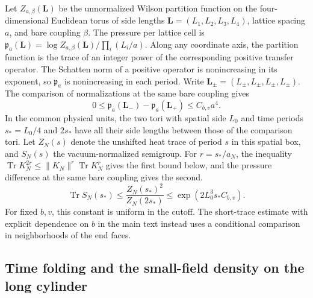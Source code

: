 \documentclass[11pt,a4paper]{article}
\numberwithin{equation}{section}
\newcommand{\Tr}{\operatorname{Tr}}
\begin{document}
Let \(Z_{a,\beta}(\boldsymbol L)\) be the unnormalized Wilson partition function on the four-dimensional Euclidean torus of side lengths \(\boldsymbol L=(L_1,L_2,L_3,L_4)\), lattice spacing \(a\), and bare coupling \(\beta\). The pressure per lattice cell is \(\mathfrak p_a(\boldsymbol L)=\log Z_{a,\beta}(\boldsymbol L)/\prod_i(L_i/a)\). Along any coordinate axis, the partition function is the trace of an integer power of the corresponding positive transfer operator. The Schatten norm of a positive operator is nonincreasing in its exponent, so \(\mathfrak p_a\) is nonincreasing in each period. Write \(\boldsymbol L_\pm=(L_\pm,L_\pm,L_\pm,L_\pm)\). The comparison of normalizations at the same bare coupling gives
\begin{equation}
 0\le\mathfrak p_a(\boldsymbol L_-)-\mathfrak p_a(\boldsymbol L_+)\le C_{b,v}a^4 .
 \label{eq:geom-pressure}
\end{equation}
In the common physical units, the two tori with spatial side \(L_0\) and time periods \(s_*=L_0/4\) and \(2s_*\) have all their side lengths between those of the comparison tori. Let \(Z_N(s)\) denote the unshifted heat trace of period \(s\) in this spatial box, and \(S_N(s)\) the vacuum-normalized semigroup. For \(r=s_*/a_N\), the inequality \(\Tr K_N^{2r}\le\|K_N\|^r\Tr K_N^r\) gives the first bound below, and the pressure difference at the same bare coupling gives the second.
\[
 \Tr S_N(s_*)\le
    \frac{Z_N(s_*)^2}{Z_N(2s_*)}
 \le \exp(2L_0^3s_* C_{b,v}) .
\]
For fixed \(b,v\), this constant is uniform in the cutoff. The short-trace estimate with explicit dependence on \(b\) in the main text instead uses a conditional comparison in neighborhoods of the end faces.

\subsection{Time folding and the small-field density on the long cylinder}
\label{lem:geometry-fold}
\label{prop:geometry-density}
\end{document}
